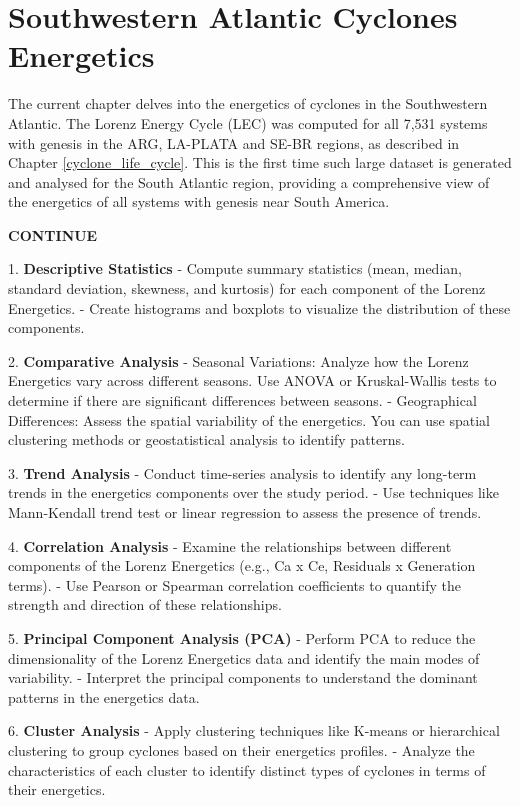 \chapter{Southwestern Atlantic Cyclones Energetics} \label{ch:energetics}

The current chapter delves into the energetics of cyclones in the Southwestern Atlantic. The Lorenz Energy Cycle (LEC) was computed for all 7,531 systems with genesis in the ARG, LA-PLATA and SE-BR regions, as described in Chapter \ref{cyclone_life_cycle}. This is the first time such large dataset is generated and analysed for the South Atlantic region, providing a comprehensive view of the energetics of all systems with genesis near South America.

\textbf{CONTINUE}


1. \textbf{Descriptive Statistics}
    - Compute summary statistics (mean, median, standard deviation, skewness, and kurtosis) for each component of the Lorenz Energetics.
    - Create histograms and boxplots to visualize the distribution of these components.

2. \textbf{Comparative Analysis}
    - Seasonal Variations: Analyze how the Lorenz Energetics vary across different seasons. Use ANOVA or Kruskal-Wallis tests to determine if there are significant differences between seasons.
    - Geographical Differences: Assess the spatial variability of the energetics. You can use spatial clustering methods or geostatistical analysis to identify patterns.

3. \textbf{Trend Analysis}
    - Conduct time-series analysis to identify any long-term trends in the energetics components over the study period.
    - Use techniques like Mann-Kendall trend test or linear regression to assess the presence of trends.

4. \textbf{Correlation Analysis}
    - Examine the relationships between different components of the Lorenz Energetics (e.g., Ca x Ce, Residuals x Generation terms).
    - Use Pearson or Spearman correlation coefficients to quantify the strength and direction of these relationships.

5. \textbf{Principal Component Analysis (PCA)}
    - Perform PCA to reduce the dimensionality of the Lorenz Energetics data and identify the main modes of variability.
    - Interpret the principal components to understand the dominant patterns in the energetics data.

6. \textbf{Cluster Analysis}
    - Apply clustering techniques like K-means or hierarchical clustering to group cyclones based on their energetics profiles.
    - Analyze the characteristics of each cluster to identify distinct types of cyclones in terms of their energetics.

